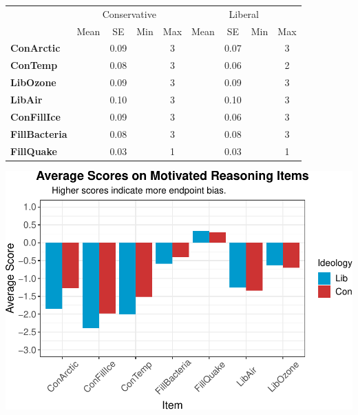 \documentclass[
]{article}
\begin{document}
\begin{tabular}{>{}l||>{}c|c|>{}c|>{}c||>{}c|c|>{}c|c}
\hline
\multicolumn{1}{c|}{ } & \multicolumn{4}{c|}{Conservative} & \multicolumn{4}{c}{Liberal} \\
\cline{2-5} \cline{6-9}
  & Mean & SE & Min & Max & Mean & SE & Min & Max\\
\hline
\textbf{ConArctic} & \cellcolor{lightgray}{-1.07} & 0.09 & \cellcolor{lightgray}{-3} & 3 & \cellcolor{lightgray}{-1.73} & 0.07 & \cellcolor{lightgray}{-3} & 3\\
\hline
\textbf{ConTemp} & \cellcolor{lightgray}{-1.37} & 0.08 & \cellcolor{lightgray}{-3} & 3 & \cellcolor{lightgray}{-1.97} & 0.06 & \cellcolor{lightgray}{-3} & 2\\
\hline
\textbf{LibOzone} & \cellcolor{lightgray}{-0.32} & 0.09 & \cellcolor{lightgray}{-3} & 3 & \cellcolor{lightgray}{-0.21} & 0.09 & \cellcolor{lightgray}{-3} & 3\\
\hline
\textbf{LibAir} & \cellcolor{lightgray}{-0.85} & 0.10 & \cellcolor{lightgray}{-3} & 3 & \cellcolor{lightgray}{-0.81} & 0.10 & \cellcolor{lightgray}{-3} & 3\\
\hline
\textbf{ConFillIce} & \cellcolor{lightgray}{-1.83} & 0.09 & \cellcolor{lightgray}{-3} & 3 & \cellcolor{lightgray}{-2.33} & 0.06 & \cellcolor{lightgray}{-3} & 3\\
\hline
\textbf{FillBacteria} & \cellcolor{lightgray}{-0.16} & 0.08 & \cellcolor{lightgray}{-3} & 3 & \cellcolor{lightgray}{-0.35} & 0.08 & \cellcolor{lightgray}{-3} & 3\\
\hline
\textbf{FillQuake} & \cellcolor{lightgray}{0.29} & 0.03 & \cellcolor{lightgray}{0} & 1 & \cellcolor{lightgray}{0.33} & 0.03 & \cellcolor{lightgray}{0} & 1\\
\hline
\end{tabular}

\includegraphics{desc0829_files/figure-latex/eb-ideo-plot-1.pdf}
\end{document}
